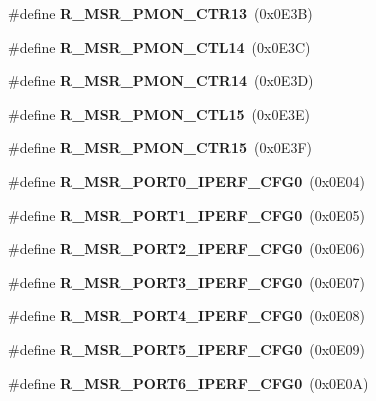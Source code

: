 \begin{DoxyCompactItemize}
\item 
\#define {\bfseries R\+\_\+\+M\+S\+R\+\_\+\+P\+M\+O\+N\+\_\+\+C\+T\+R13}~(0x0\+E3\+B)\label{types_8h_aab7a03250792a657718626c581233389}

\item 
\#define {\bfseries R\+\_\+\+M\+S\+R\+\_\+\+P\+M\+O\+N\+\_\+\+C\+T\+L14}~(0x0\+E3\+C)\label{types_8h_af763232e0cf73ab683dea895c4c08d46}

\item 
\#define {\bfseries R\+\_\+\+M\+S\+R\+\_\+\+P\+M\+O\+N\+\_\+\+C\+T\+R14}~(0x0\+E3\+D)\label{types_8h_adb00e6f65301c9fb8e27d352bdc2f86b}

\item 
\#define {\bfseries R\+\_\+\+M\+S\+R\+\_\+\+P\+M\+O\+N\+\_\+\+C\+T\+L15}~(0x0\+E3\+E)\label{types_8h_a2a446dd93e56fe597c4c45ddea703146}

\item 
\#define {\bfseries R\+\_\+\+M\+S\+R\+\_\+\+P\+M\+O\+N\+\_\+\+C\+T\+R15}~(0x0\+E3\+F)\label{types_8h_a64f833080da0bdc3be605b901cb71a19}

\item 
\#define {\bfseries R\+\_\+\+M\+S\+R\+\_\+\+P\+O\+R\+T0\+\_\+\+I\+P\+E\+R\+F\+\_\+\+C\+F\+G0}~(0x0\+E04)\label{types_8h_a4f4380ac1df3e08b742587229155efef}

\item 
\#define {\bfseries R\+\_\+\+M\+S\+R\+\_\+\+P\+O\+R\+T1\+\_\+\+I\+P\+E\+R\+F\+\_\+\+C\+F\+G0}~(0x0\+E05)\label{types_8h_a7ee270e4c83cf7c06e7839cefe26375a}

\item 
\#define {\bfseries R\+\_\+\+M\+S\+R\+\_\+\+P\+O\+R\+T2\+\_\+\+I\+P\+E\+R\+F\+\_\+\+C\+F\+G0}~(0x0\+E06)\label{types_8h_abe4e540734062b1f4863f6148d84a04c}

\item 
\#define {\bfseries R\+\_\+\+M\+S\+R\+\_\+\+P\+O\+R\+T3\+\_\+\+I\+P\+E\+R\+F\+\_\+\+C\+F\+G0}~(0x0\+E07)\label{types_8h_a2a07b8a385a63c2ead3d2473903329b3}

\item 
\#define {\bfseries R\+\_\+\+M\+S\+R\+\_\+\+P\+O\+R\+T4\+\_\+\+I\+P\+E\+R\+F\+\_\+\+C\+F\+G0}~(0x0\+E08)\label{types_8h_a4644cdd3eb864a2d2be73d029501705c}

\item 
\#define {\bfseries R\+\_\+\+M\+S\+R\+\_\+\+P\+O\+R\+T5\+\_\+\+I\+P\+E\+R\+F\+\_\+\+C\+F\+G0}~(0x0\+E09)\label{types_8h_a5a572317282e8caaea64576e7fff3dbf}

\item 
\#define {\bfseries R\+\_\+\+M\+S\+R\+\_\+\+P\+O\+R\+T6\+\_\+\+I\+P\+E\+R\+F\+\_\+\+C\+F\+G0}~(0x0\+E0\+A)\label{types_8h_a02ac6e4efb4adbb600d19ad98d84046b}


\end{DoxyCompactItemize}
